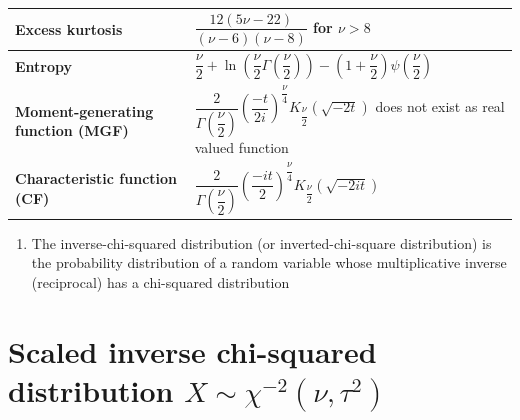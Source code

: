 \begin{alternateColorTable}
\begin{longtable}{|m{6cm}|p{9cm}|}
    \textbf{Excess kurtosis} &
    ${\displaystyle {\dfrac {12(5\nu -22)}{(\nu -6)(\nu -8)}}\!}$ for ${\displaystyle \nu >8\!}$
    \\[1ex] \hline

    \textbf{Entropy} &
    ${\displaystyle {\dfrac {\nu }{2}}\!+\!\ln \!\left({\dfrac {\nu }{2}}\Gamma \!\left({\dfrac {\nu }{2}}\right)\right)} {\displaystyle \!-\!\left(1\!+\!{\dfrac {\nu }{2}}\right)\psi \!\left({\dfrac {\nu }{2}}\right)}$
    \\[1ex] \hline

    \textbf{Moment-generating function (MGF)} &
    ${\displaystyle {\dfrac {2}{\Gamma ({\dfrac {\nu }{2}})}}\left({\dfrac {-t}{2i}}\right)^{\!\!{\dfrac {\nu }{4}}}K_{\dfrac {\nu }{2}}\!\left({\sqrt {-2t}}\right)}$ does not exist as real valued function
    \\[1ex] \hline

    \textbf{Characteristic function (CF)} &
    ${\displaystyle {\dfrac {2}{\Gamma ({\dfrac {\nu }{2}})}}\left({\dfrac {-it}{2}}\right)^{\!\!{\dfrac {\nu }{4}}}K_{\dfrac {\nu }{2}}\!\left({\sqrt {-2it}}\right)}$
    \\[1ex] \hline

\end{longtable}
\renewcommand{\arraystretch}{1}
\end{alternateColorTable}


\begin{enumerate}
    \item The inverse-chi-squared distribution (or inverted-chi-square distribution) is the probability distribution of a random variable whose multiplicative inverse (reciprocal) has a chi-squared distribution

\end{enumerate}


\section{Scaled inverse chi-squared distribution $X \sim \chi^{-2}(\nu, \tau^2)$ \cite{wiki/Scaled_inverse_chi-squared_distribution}} \label{Scaled inverse chi-squared distribution}


